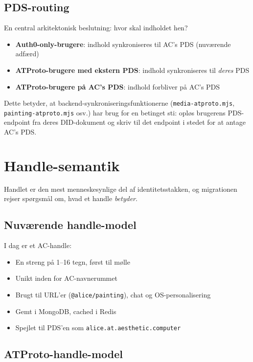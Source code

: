\documentclass[10pt,letterpaper,twocolumn]{article}
\begin{document}
\subsection{PDS-routing}

En central arkitektonisk beslutning: hvor skal indholdet hen?

\begin{itemize}
  \item \textbf{Auth0-only-brugere}: indhold synkroniseres til AC's PDS (nuværende adfærd)
  \item \textbf{ATProto-brugere med ekstern PDS}: indhold synkroniseres til \emph{deres} PDS
  \item \textbf{ATProto-brugere på AC's PDS}: indhold forbliver på AC's PDS
\end{itemize}

Dette betyder, at backend-synkroniseringsfunktionerne (\texttt{media-atproto.mjs}, \texttt{painting-atproto.mjs} osv.) har brug for en betinget sti: opløs brugerens PDS-endpoint fra deres DID-dokument og skriv til det endpoint i stedet for at antage AC's PDS.


\section{Handle-semantik}
\label{sec:handles}

Handlet er den mest menneskesynlige del af identitetsstakken, og migrationen rejser spørgsmål om, hvad et handle \emph{betyder}.

\subsection{Nuværende handle-model}

I dag er et AC-handle:
\begin{itemize}
  \item En streng på 1--16 tegn, først til mølle
  \item Unikt inden for AC-navnerummet
  \item Brugt til URL'er (\texttt{@alice/painting}), chat og OS-personalisering
  \item Gemt i MongoDB, cached i Redis
  \item Spejlet til PDS'en som \texttt{alice.at.aesthetic.computer}
\end{itemize}

\subsection{ATProto-handle-model}
\end{document}
